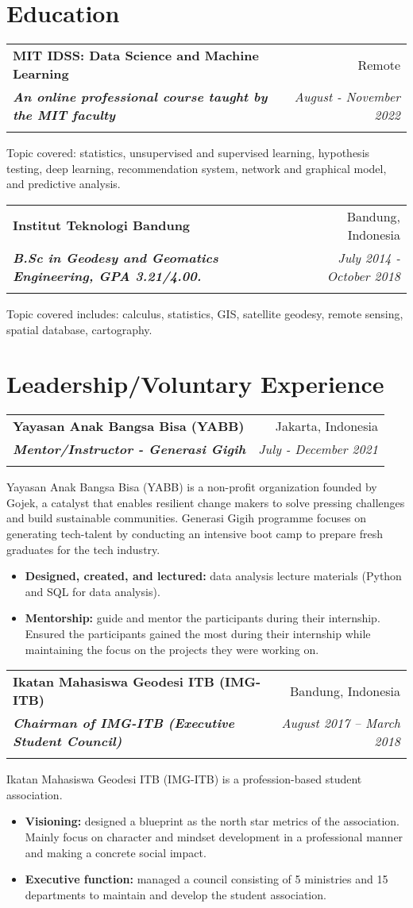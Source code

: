 \documentclass[a4paper, 11pt]{article}
\makeatletter
\newcommand{\resumeItem}[2]{
    \item\small{
        \textbf{#1}{#2 \vspace{-2pt}}
    }
}
\newcommand{\resumeSubheading}[4]{
    \vspace{-1pt}
    \begin{tabular*}{\textwidth}{l@{\extracolsep{\fill}}r}
        \color{lightblue}\textbf{#1} & #2 \\
        \textbf{\textit{\small#3}} & \textit{\small #4} \\
        \textnormal{}\vspace{-5pt}
    \end{tabular*}\vspace{-5pt}
}
\newcommand{\resumeItemListStart}{\begin{itemize}[leftmargin=*]\setlength\itemsep{0em}\vspace{-1pt}}
\newcommand{\resumeItemListEnd}{\end{itemize}\vspace{-5pt}}
\makeatother
\begin{document}
    \section{Education}

    \resumeSubheading
    {MIT IDSS: Data Science and Machine Learning}
    {Remote}
    {An online professional course taught by the MIT faculty}
    {August - November 2022}
    \small{Topic covered: statistics, unsupervised and supervised learning, hypothesis testing, 
    deep learning, recommendation system, network and graphical model, and predictive 
    analysis.}
    
    \vspace{5pt}
    \resumeSubheading
    {Institut Teknologi Bandung}
    {Bandung, Indonesia}
    {B.Sc in Geodesy and Geomatics Engineering, GPA 3.21/4.00.}
    {July 2014 - October 2018}
    \small{Topic covered includes: calculus, statistics, GIS, satellite geodesy, 
    remote sensing, spatial database, cartography.}

    \vspace{-5pt}
    \section{Leadership/Voluntary Experience}

    \resumeSubheading
    {Yayasan Anak Bangsa Bisa (YABB)}
    {Jakarta, Indonesia}
    {Mentor/Instructor - Generasi Gigih}
    {July - December 2021}
    \small{Yayasan Anak Bangsa Bisa (YABB) is a non-profit organization founded by Gojek, a
    catalyst that enables resilient change makers to solve pressing challenges and build
    sustainable communities. Generasi Gigih programme focuses on generating tech-talent
    by conducting an intensive boot camp to prepare fresh graduates for the tech industry.}
    \vspace{-1pt}
    \resumeItemListStart
    \resumeItem{Designed, created, and lectured:}{ data analysis lecture materials (Python and SQL
    for data analysis).}
    \resumeItem{Mentorship:}{ guide and mentor the participants during their internship. Ensured the participants gained the most during their internship while maintaining the focus on the projects they were working on.}
    \resumeItemListEnd

    \vspace{5pt}
    \resumeSubheading
    {Ikatan Mahasiswa Geodesi ITB (IMG-ITB)}
    {Bandung, Indonesia}
    {Chairman of IMG-ITB (Executive Student Council)}
    {August 2017 – March 2018}
    \small{Ikatan Mahasiswa Geodesi ITB (IMG-ITB) is a profession-based student association.}
    \vspace{-1pt}
    \resumeItemListStart
    \resumeItem{Visioning:}{ designed a blueprint as the north star metrics of the
    association. Mainly focus on character and mindset development in a
    professional manner and making a concrete social impact.}
    \resumeItem{Executive function:}{ managed a council consisting of 5 ministries and 15
    departments to maintain and develop the student association.}
    \resumeItemListEnd
\end{document}

